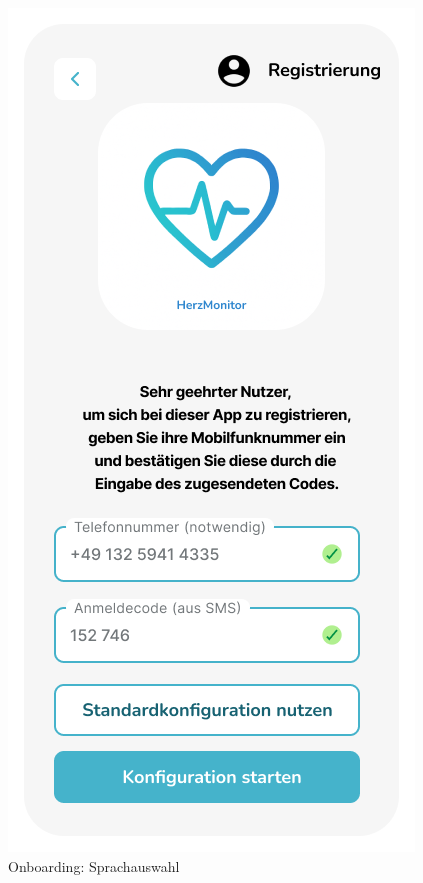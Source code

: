 \begin{figure}[h!]
\begin{minipage}{0.3\linewidth}
		\caption{Onboarding: Sprachauswahl}
		\label{fig:sprachauswahl}
	\end{minipage}
	\hfill
	\begin{minipage}{0.3\linewidth}
		\centering
		\includegraphics[width=\linewidth]{images/Registrierung}

\end{minipage}
\end{figure}

